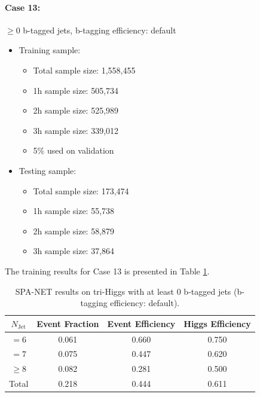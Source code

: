 \documentclass[12pt]{article}
\begin{document}
		\paragraph{Case 13:} $\ge 0$ b-tagged jets, b-tagging efficiency: default
		\begin{itemize}
			\item Training sample:
			\begin{itemize}
				\item Total sample size: 1,558,455
				\item 1h sample size: 505,734
				\item 2h sample size: 525,989
				\item 3h sample size: 339,012
				\item 5\% used on validation
			\end{itemize}
			\item Testing sample: 
				\begin{itemize}
					\item Total sample size: 173,474
					\item 1h sample size: 55,738
					\item 2h sample size: 58,879
					\item 3h sample size: 37,864
				\end{itemize}
		\end{itemize}
		The training results for Case 13 is presented in Table \ref{tab:SPANet_triHiggs_0btag_default_3M}.
		\begin{table}[htpb]
			\centering
			\caption{SPA-NET results on tri-Higgs with at least 0 b-tagged jets (b-tagging efficiency: default).}
			\label{tab:SPANet_triHiggs_0btag_default_3M}
			\begin{tabular}{c|c|cc}
				$N_\text{Jet}$ & Event Fraction & Event Efficiency & Higgs Efficiency \\
				\hline
				$=6$	  &   0.061             &    0.660              &    0.750             \\
				$=7$	  &   0.075             &    0.447              &    0.620             \\
				$\ge 8$	  &   0.082             &    0.281              &    0.500             \\
				Total	  &   0.218             &    0.444              &    0.611             \\
			\end{tabular}
		\end{table}
\end{document}
